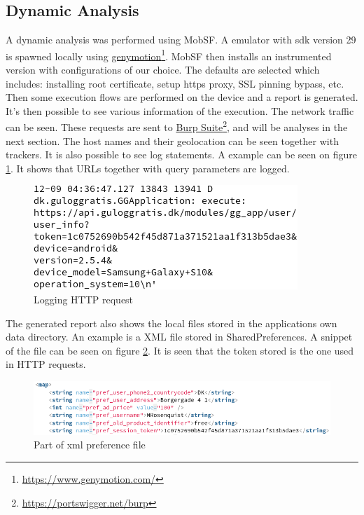 \subsection{Dynamic Analysis}
A dynamic analysis was performed using MobSF. A emulator with sdk version 29 is spawned locally using \href{https://www.genymotion.com/}{genymotion}\footnote{\href{https://www.genymotion.com/}{https://www.genymotion.com/}}. MobSF then installs an instrumented version with configurations of our choice. The defaults are selected which includes: installing root certificate, setup https proxy, SSL pinning bypass, etc. Then some execution flows are performed on the device and a report is generated. It's then possible to see various information of the execution. The network traffic can be seen. These requests are sent to \href{https://portswigger.net/burp}{Burp Suite}\footnote{\href{https://portswigger.net/burp}{https://portswigger.net/burp}}, and will be analyses in the next section. The host names and their geolocation can be seen together with trackers. It is also possible to see log statements. A example can be seen on figure \ref{fig:log-login-request}. It shows that URLs together with query parameters are logged.  

\begin{figure}[htbp]
    \centering
    \includegraphics[width=1\columnwidth]{../static-analysis/pictures/log-login-request.png}
    \caption{Logging HTTP request}
    \label{fig:log-login-request}
\end{figure}

The generated report also shows the local files stored in the applications own data directory. An example is a XML file stored in SharedPreferences. A snippet of the file can be seen on figure \ref{fig:gull-prefs-xml}. It is seen that the token stored is the one used in HTTP requests.  

\begin{figure}[htbp]
    \centering
    \includegraphics[width=1\columnwidth]{../static-analysis/pictures/gull-prefs-xml.png}
    \caption{Part of xml preference file}
    \label{fig:gull-prefs-xml}
\end{figure}